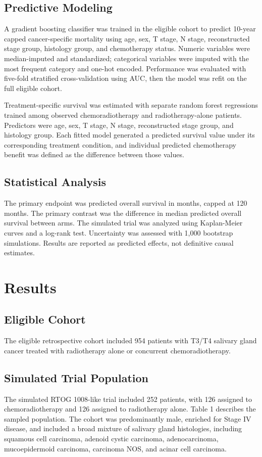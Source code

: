 \documentclass[10pt,twocolumn]{article}
\begin{document}
\subsection{Predictive Modeling}
A gradient boosting classifier was trained in the eligible cohort to predict 10-year capped cancer-specific mortality using age, sex, T stage, N stage, reconstructed stage group, histology group, and chemotherapy status. Numeric variables were median-imputed and standardized; categorical variables were imputed with the most frequent category and one-hot encoded. Performance was evaluated with five-fold stratified cross-validation using AUC, then the model was refit on the full eligible cohort.


Treatment-specific survival was estimated with separate random forest regressions trained among observed chemoradiotherapy and radiotherapy-alone patients. Predictors were age, sex, T stage, N stage, reconstructed stage group, and histology group. Each fitted model generated a predicted survival value under its corresponding treatment condition, and individual predicted chemotherapy benefit was defined as the difference between those values.


\subsection{Statistical Analysis}
The primary endpoint was predicted overall survival in months, capped at 120 months. The primary contrast was the difference in median predicted overall survival between arms. The simulated trial was analyzed using Kaplan-Meier curves and a log-rank test. Uncertainty was assessed with 1,000 bootstrap simulations. Results are reported as predicted effects, not definitive causal estimates.


\section{Results}

\subsection{Eligible Cohort}
The eligible retrospective cohort included 954 patients with T3/T4 salivary gland cancer treated with radiotherapy alone or concurrent chemoradiotherapy.


\subsection{Simulated Trial Population}
The simulated RTOG 1008-like trial included 252 patients, with 126 assigned to chemoradiotherapy and 126 assigned to radiotherapy alone. Table 1 describes the sampled population. The cohort was predominantly male, enriched for Stage IV disease, and included a broad mixture of salivary gland histologies, including squamous cell carcinoma, adenoid cystic carcinoma, adenocarcinoma, mucoepidermoid carcinoma, carcinoma NOS, and acinar cell carcinoma.
\end{document}

